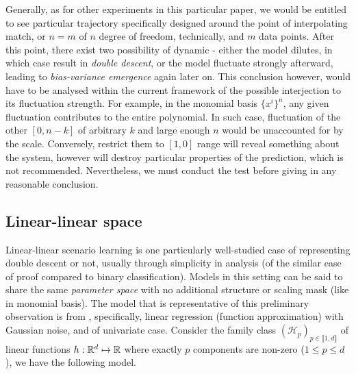 \documentclass[10pt]{article}
\begin{document}
Generally, as for other experiments in this particular paper, we would be entitled to see particular trajectory specifically designed around the point of interpolating match, or $n=m$ of $n$ degree of freedom, technically, and $m$ data points. After this point, there exist two possibility of dynamic - either the model dilutes, in which case result in \textit{double descent}, or the model fluctuate strongly afterward, leading to \textit{bias-variance emergence} again later on. This conclusion however, would have to be analysed within the current framework of the possible interjection to its fluctuation strength. For example, in the monomial basis $\{x^{i}\}^{n}$, any given fluctuation contributes to the entire polynomial. In such case, fluctuation of the other $[0,n-k]$ of arbitrary $k$ and large enough $n$ would be unaccounted for by the scale. Conversely, restrict them to $[1,0]$ range will reveal something about the system, however will destroy particular properties of the prediction, which is not recommended. Nevertheless, we must conduct the test before giving in any reasonable conclusion. 
\clearpage

\subsection{Linear-linear space}

Linear-linear scenario learning is one particularly well-studied case of representing double descent or not, usually through simplicity in analysis (of the similar ease of proof compared to binary classification). Models in this setting can be said to share the same \textit{parameter space} with no additional structure or scaling mask (like in monomial basis). The model that is representative of this preliminary observation is from \cite{lafon_understanding_2024}, specifically, linear regression (function approximation) with Gaussian noise, and of univariate case. Consider the family class $(\mathcal{H}_p)_{p\in\llbracket1,d\rrbracket}$ of linear functions $h:\mathbb{R}^d\mapsto \mathbb{R}$ where exactly $p$ components are non-zero ($1\leq p\leq d$), we have the following model.
\end{document}
